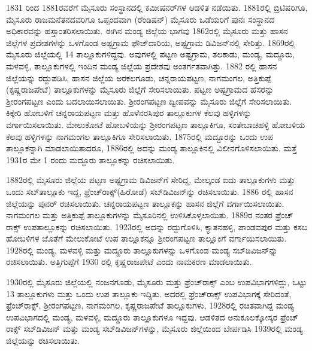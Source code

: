 1831 ರಿಂದ 1881ರವರೆಗೆ ಮೈಸೂರು ಸಂಸ್ಥಾನದಲ್ಲಿ ಕಮೀಷನರ್​ಗಳ ಆಡಳಿತ ನಡೆಯಿತು. 1881ರಲ್ಲಿ ಬ್ರಿಟಿಷರಿಗೂ, ಮೈಸೂರು ರಾಜಮನೆತನದವರಿಗೂ ಒಪ್ಪಂದವಾಗಿ (ರೆಂಡಿಷನ್​) ಮೈಸೂರು ಒಡೆಯರಿಗೆ ಪುನಃ ಸಂಸ್ಥಾನದ ಅಧಿಕಾರವನ್ನು ಹಸ್ತಾಂತರಿಸಲಾಯಿತು. ಈಗಿನ ಮಂಡ್ಯ ಜಿಲ್ಲೆಯ ಭಾಗವು 1862ರಲ್ಲಿ ಮೈಸೂರು ಮತ್ತು ಹಾಸನ ಜಿಲ್ಲೆಗಳ ಪ್ರದೇಶಗಳನ್ನು ಒಳಗೊಂಡ ಅಷ್ಟಗ್ರಾಮ ಫೌಜ್​ದಾರಿಯ, ಅಷ್ಟಗ್ರಾಮ ಡಿವಿಜನ್​ನಲ್ಲಿ ಸೇರಿತ್ತು. 1869ರಲ್ಲಿ ಮೈಸೂರು ಜಿಲ್ಲೆಯಲ್ಲಿ 14 ತಾಲ್ಲೂಕುಗಳಿದ್ದವು. ಅವುಗಳಲ್ಲಿ ಪಟ್ಟಣ ಅಷ್ಟಗ್ರಾಮ, ತಲಕಾಡು, ಮಂಡ್ಯ, ಮದ್ದೂರು, ಮಳವಳ್ಳಿ, ತಾಲ್ಲೂಕುಗಳಲ್ಲಿ ಇಂದಿನ ಮಂಡ್ಯ ಜಿಲ್ಲೆಯ ಪ್ರದೇಶವು ಅಂತರ್ಗತವಾಗಿತ್ತು. 1882 ರಲ್ಲಿ ಹಾಸನ ಜಿಲ್ಲೆಯನ್ನು ರದ್ದುಪಡಿಸಿ, ಹಾಸನ ಜಿಲ್ಲೆಯ ಅರಕಲಗೂಡು, ಚನ್ನರಾಯಪಟ್ಟಣ, ನಾಗಮಂಗಲ, ಅತ್ತಿಕುಪ್ಪೆ (ಕೃಷ್ಣರಾಜಪೇಟೆ) ತಾಲ್ಲೂಕುಗಳನ್ನು ಮೈಸೂರು ಜಿಲ್ಲೆಗೆ ಸೇರಿಸಲಾಯಿತು. ಪಟ್ಟಣ ಅಷ್ಟಗ್ರಾಮದ ಹೆಸರನ್ನು ಶ‍್ರೀರಂಗಪಟ್ಟಣ ಎಂದು ಬದಲಾಯಿಸಲಾಯಿತು. ಶ‍್ರೀರಂಗಪಟ್ಟಣ ದ್ವೀಪವನ್ನು ಮೈಸೂರು ಜಿಲ್ಲೆಗೆ ಸೇರಿಸಲಾಯಿತು. ಕಿಕ್ಕೇರಿ ಹೋಬಳಿಗೆ ಚನ್ನರಾಯಪಟ್ಟಣ ಮತ್ತು ಹೊಳೆನರಸಿಪುರ ತಾಲ್ಲೂಕುಗಳ ಕೆಲವು ಹಳ್ಳಿಗಳನ್ನು ವರ್ಗಾಯಿಸಲಾಯಿತು. ಮೇಲುಕೋಟೆ ಹೋಬಳಿಯನ್ನು ಶ‍್ರೀರಂಗಪಟ್ಟಣ ತಾಲ್ಲೂಕಿಗೂ, ಸಂತೇಬಾಚಹಳ್ಳಿ ಹೋಬಳಿಯ ಕೆಲವು ಹಳ್ಳಿಗಳನ್ನು ನಾಗಮಂಗಲ ತಾಲ್ಲೂಕಿಗೂ ಸೇರಿಸಲಾಯಿತು. 1875ರಲ್ಲಿ ಮದ್ದೂರನ್ನು ಒಂದು ಉಪ ತಾಲ್ಲೂಕನ್ನಾಗಿ ಮಾಡಲಾಯಿತಾದರೂ, 1886ರಲ್ಲಿ ಅದನ್ನು ಮಂಡ್ಯ ತಾಲ್ಲೂಕಿನಲ್ಲಿ ವಿಲೀನ\break ಗೊಳಿಸಲಾಯಿತು. ಮತ್ತೆ 1931ರ ಮೇ 1 ರಂದು ಮದ್ದೂರು ತಾಲ್ಲೂಕನ್ನು ರಚಿಸಲಾಯಿತು.

1882ರಲ್ಲಿ ಮೈಸೂರು ಜಿಲ್ಲೆಯ ಪಟ್ಟಣ ಅಷ್ಟಗ್ರಾಮ ಡಿವಿಜನ್​ಗೆ ಸೇರಿದ್ದ, ಮೇಲ್ಕಂಡ ಐದು ತಾಲ್ಲೂಕುಗಳು ಮತ್ತು ಒಂದು ಸಬ್​ತಾಲ್ಲೂಕು ಇದ್ದ, ಫ್ರೆಂಚ್​ರಾಕ್ಸ್​(ಹಿರೋಡೆ) ಸಬ್​ಡಿವಿಜನ್​ನ್ನು ರಚಿಸಲಾಯಿತು. 1886 ರಲ್ಲಿ ಹಾಸನ ಜಿಲ್ಲೆಯನ್ನು ಪುನರ್ ರಚಿಸಲಾಯಿತು. ಚನ್ನರಾಯಪಟ್ಟಣ ತಾಲ್ಲೂಕನ್ನು ಹಾಸನ ಜಿಲ್ಲೆಗೆ ವರ್ಗಾಯಿಸಲಾಯಿತು. ನಾಗಮಂಗಲ ಮತ್ತು ಅತ್ತಿಕುಪ್ಪೆ ತಾಲ್ಲೂಕುಗಳನ್ನು ಮೈಸೂರಿನಲ್ಲಿ ಉಳಿಸಿಕೊಳ್ಳಲಾಯಿತು. 1889ರ ನಂತರ ಫ್ರೆಂಚ್​ರಾಕ್ಸ್​ ಉಪತಾಲ್ಲೂಕನ್ನು ರಚಿಸಲಾಯಿತು. 1923ರಲ್ಲಿ ಅದನ್ನು ರದ್ದುಗೊಳಿಸಿ, ಕ್ಯಾತನಹಳ್ಳಿ, ಪಾಂಡವಪುರ ಮತ್ತು ಕಸಬ ಹೋಬಳಿಗಳ ಜೊತೆಗೆ ಮೇಲುಕೋಟೆ ಉಪ ತಾಲ್ಲೂಕನ್ನೂ ಶ‍್ರೀರಂಗಪಟ್ಟಣ ತಾಲ್ಲೂಕಿಗೆ ವರ್ಗಾಯಿಸಲಾಯಿತು. 1928ರಲ್ಲಿ ಮಂಡ್ಯ, ಮಳವಳ್ಳಿ ಮತ್ತು ಮದ್ದೂರು ತಾಲ್ಲೂಕುಗಳನ್ನು ಒಳಗೊಂಡ ಮಂಡ್ಯ ಸಬ್​ಡಿವಿಜನ್​ನ್ನು ರಚಿಸಲಾಯಿತು. ಅತ್ತಿಗುಪ್ಪೆಗೆ 1930 ರಲ್ಲಿ ಕೃಷ್ಣರಾಜಪೇಟೆ ಎಂದು ನಾಮಕರಣ ಮಾಡಲಾಯಿತು.

1930ರಲ್ಲಿ ಮೈಸೂರು ಜಿಲ್ಲೆಯಲ್ಲಿ ನಂಜನಗೂಡು, ಮೈಸೂರು ಮತ್ತು ಫ್ರೆಂಚ್​ರಾಕ್ಸ್​ ಎಂಬ ಉಪವಿಭಾಗಗಳಿದ್ದು, ಒಟ್ಟು 13 ತಾಲ್ಲೂಕುಗಳು ಮತ್ತು ಒಂದು ಉಪ ತಾಲ್ಲೂಕು ಇದ್ದಿತು. ಅದರಲ್ಲಿ ಫ್ರೆಂಚ್​ರಾಕ್ಸ್​ ಉಪವಿಭಾಗಕ್ಕೆ ಸೇರಿದಂತೆ, ಫ್ರೆಂಚ್​ರಾಕ್ಸ್​, ಶ‍್ರೀರಂಗಪಟ್ಟಣ, ನಾಗಮಂಗಲ, ಕೃಷ್ಣರಾಜಪೇಟೆ ತಾಲ್ಲೂಕುಗಳು, 1928ರಲ್ಲಿ ರಚಿತವಾಗಿದ್ದ ಮಂಡ್ಯ ಉಪವಿಭಾಗದಲ್ಲಿ ಮಂಡ್ಯ, ಮಳವಳ್ಳಿ, ಮದ್ದೂರು ತಾಲ್ಲೂಕುಗಳೂ ಇದ್ದವು. ಆಡಳಿತದ ಅನುಕೂಲಕ್ಕೋಸ್ಕರ ಫ್ರೆಂಚ್​ರಾಕ್ಸ್​ ಸಬ್​ಡಿವಿಜನ್​ ಮತ್ತು ಮಂಡ್ಯ ಸಬ್​ಡಿವಿಜನ್​ಗಳನ್ನು, ಮೈಸೂರು ಜಿಲ್ಲೆಯಿಂದ ಬೇರ್ಪಡಿಸಿ 1939ರಲ್ಲಿ ಮಂಡ್ಯ ಜಿಲ್ಲೆಯನ್ನು ರಚಿಸಲಾಯಿತು.

